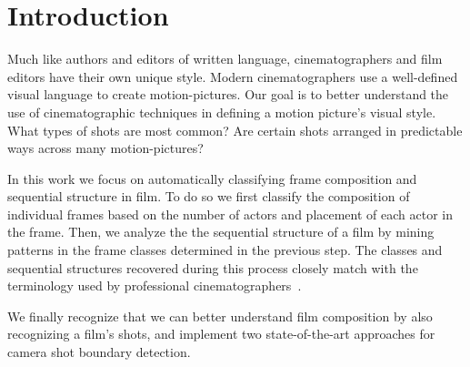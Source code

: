 \section*{Introduction}

Much like authors and editors of written language, cinematographers and film editors have their own unique style.
Modern cinematographers use a well-defined visual language to create motion-pictures. Our goal is to better understand the use of cinematographic techniques in defining a motion picture's visual style. What types of shots are most common? Are certain shots arranged in predictable ways across many motion-pictures?

In this work we focus on automatically classifying frame composition and sequential structure in film.  To do so we first classify the composition of individual frames based on the number of actors and placement of each actor in the frame.  Then, we analyze the the sequential structure of a film by mining patterns in the frame classes determined in the previous step.  The classes and sequential structures recovered during this process closely match with the terminology used by professional cinematographers~\cite{}.  

We finally recognize that we can better understand film composition by also recognizing a film's shots, and implement two state-of-the-art approaches for camera shot boundary detection.